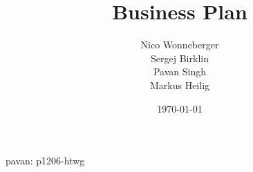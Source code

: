 \documentclass[11pt]{report}
\title{Business Plan}
\author{Nico Wonneberger \\ Sergej Birklin \\ Pavan Singh \\ Markus Heilig}
\date{\today}
\begin{document}
\maketitle

\tableofcontents









pavan: p1206-htwg
\end{document}

